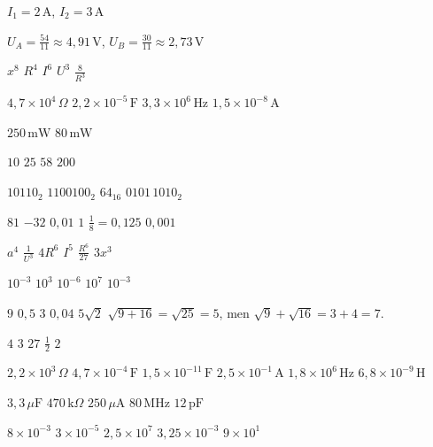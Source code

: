
\begin{facit}

 $I_1 = 2\,\text{A}$, $I_2 = 3\,\text{A}$

 $U_A = \frac{54}{11} \approx 4{,}91\,\text{V}$, $U_B = \frac{30}{11} \approx
2{,}73\,\text{V}$

  $x^8$  $R^4$  $I^6$  $U^3$  $\frac{8}{R^3}$

  $4{,}7 \times 10^4\,\Omega$  $2{,}2 \times 10^{-5}\,\text{F}$
 $3{,}3 \times 10^6\,\text{Hz}$  $1{,}5 \times 10^{-8}\,\text{A}$

  $250\,\text{mW}$  $80\,\text{mW}$

  $10$  $25$  $58$  $200$

  $10110_2$  $1100100_2$  $\mathrm{64}_{16}$  $0101\,1010_2$

  $81$  $-32$  $0{,}01$  $1$  $\frac{1}{8} = 0{,}125$
 $0{,}001$

  $a^4$  $\frac{1}{U^3}$  $4R^6$  $I^5$  $\frac{R^6}{27}$
 $3x^3$

  $10^{-3}$  $10^3$  $10^{-6}$  $10^7$  $10^{-3}$

  $9$  $0{,}5$  $3$  $0{,}04$  $5\sqrt{2}$
 $\sqrt{9 + 16} = \sqrt{25} = 5$, men $\sqrt{9} + \sqrt{16} = 3 + 4 = 7$.

  $4$  $3$  $27$  $\frac{1}{2}$  $2$

  $2{,}2 \times 10^3\,\Omega$  $4{,}7 \times 10^{-4}\,\text{F}$
 $1{,}5 \times 10^{-11}\,\text{F}$  $2{,}5 \times 10^{-1}\,\text{A}$
 $1{,}8 \times 10^6\,\text{Hz}$  $6{,}8 \times 10^{-9}\,\text{H}$

  $3{,}3\,\mu\text{F}$  $470\,\text{k}\Omega$  $250\,\mu\text{A}$
 $80\,\text{MHz}$  $12\,\text{pF}$

  $8 \times 10^{-3}$  $3 \times 10^{-5}$  $2{,}5 \times 10^7$
 $3{,}25 \times 10^{-3}$  $9 \times 10^1$


\end{facit}
